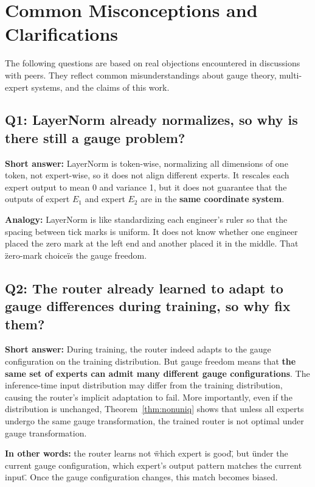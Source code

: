 \documentclass[12pt,a4paper]{article}
\theoremstyle{remark}
\begin{document}
\section{Common Misconceptions and Clarifications}

The following questions are based on real objections encountered in discussions with peers. They reflect common misunderstandings about gauge theory, multi-expert systems, and the claims of this work.

\subsection*{Q1: LayerNorm already normalizes, so why is there still a gauge problem?}

\textbf{Short answer:} LayerNorm is token-wise, normalizing all dimensions of one token, not expert-wise, so it does not align different experts. It rescales each expert output to mean 0 and variance 1, but it does not guarantee that the outputs of expert $E_1$ and expert $E_2$ are in the \textbf{same coordinate system}.

\textbf{Analogy:} LayerNorm is like standardizing each engineer's ruler so that the spacing between tick marks is uniform. It does not know whether one engineer placed the zero mark at the left end and another placed it in the middle. That \"zero-mark choice\" is the gauge freedom.

\subsection*{Q2: The router already learned to adapt to gauge differences during training, so why fix them?}

\textbf{Short answer:} During training, the router indeed adapts to the gauge configuration on the training distribution. But gauge freedom means that \textbf{the same set of experts can admit many different gauge configurations}. The inference-time input distribution may differ from the training distribution, causing the router's implicit adaptation to fail. More importantly, even if the distribution is unchanged, Theorem~\ref{thm:nonuniq} shows that unless all experts undergo the same gauge transformation, the trained router is not optimal under gauge transformation.

\textbf{In other words:} the router learns not \"which expert is good\", but \"under the current gauge configuration, which expert's output pattern matches the current input\". Once the gauge configuration changes, this match becomes biased.
\end{document}

